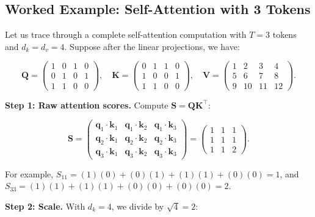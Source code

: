 \subsection{Worked Example: Self-Attention with 3 Tokens}
\label{sec:attention-worked-example}

Let us trace through a complete self-attention computation with $T = 3$ tokens and $d_k = d_v = 4$. Suppose after the linear projections, we have:

\begin{equation}
\mathbf{Q} = \begin{pmatrix} 1 & 0 & 1 & 0 \\ 0 & 1 & 0 & 1 \\ 1 & 1 & 0 & 0 \end{pmatrix}, \quad
\mathbf{K} = \begin{pmatrix} 0 & 1 & 1 & 0 \\ 1 & 0 & 0 & 1 \\ 1 & 1 & 0 & 0 \end{pmatrix}, \quad
\mathbf{V} = \begin{pmatrix} 1 & 2 & 3 & 4 \\ 5 & 6 & 7 & 8 \\ 9 & 10 & 11 & 12 \end{pmatrix}.
\end{equation}

\textbf{Step 1: Raw attention scores.} Compute $\mathbf{S} = \mathbf{Q}\mathbf{K}^\top$:

\begin{equation}
\mathbf{S} = \begin{pmatrix}
\mathbf{q}_1 \cdot \mathbf{k}_1 & \mathbf{q}_1 \cdot \mathbf{k}_2 & \mathbf{q}_1 \cdot \mathbf{k}_3 \\
\mathbf{q}_2 \cdot \mathbf{k}_1 & \mathbf{q}_2 \cdot \mathbf{k}_2 & \mathbf{q}_2 \cdot \mathbf{k}_3 \\
\mathbf{q}_3 \cdot \mathbf{k}_1 & \mathbf{q}_3 \cdot \mathbf{k}_2 & \mathbf{q}_3 \cdot \mathbf{k}_3
\end{pmatrix} = \begin{pmatrix}
1 & 1 & 1 \\
1 & 1 & 1 \\
1 & 1 & 2
\end{pmatrix}.
\end{equation}

For example, $S_{11} = (1)(0) + (0)(1) + (1)(1) + (0)(0) = 1$, and $S_{33} = (1)(1) + (1)(1) + (0)(0) + (0)(0) = 2$.

\textbf{Step 2: Scale.} With $d_k = 4$, we divide by $\sqrt{4} = 2$:

